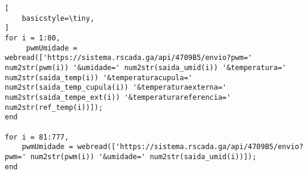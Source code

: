 \label{an:anexo-incubadora-neonatal}

\begin{lstlisting}[
    basicstyle=\tiny,
]
for i = 1:80,
     pwmUmidade = webread(['https://sistema.rscada.ga/api/4709B5/envio?pwm=' num2str(pwm(i)) '&umidade=' num2str(saida_umid(i)) '&temperatura=' num2str(saida_temp(i)) '&temperaturacupula=' num2str(saida_temp_cupula(i)) '&temperaturaexterna=' num2str(saida_tempe_ext(i)) '&temperaturareferencia=' num2str(ref_temp(i))]);
end

for i = 81:777,
    pwmUmidade = webread(['https://sistema.rscada.ga/api/4709B5/envio?pwm=' num2str(pwm(i)) '&umidade=' num2str(saida_umid(i))]);
end
\end{lstlisting}